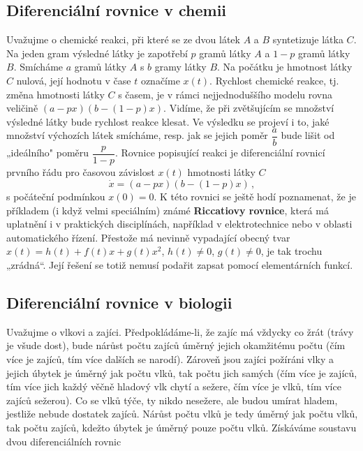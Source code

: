     \subsection{Diferenciální rovnice v chemii}
      Uvažujme o chemické reakci, při které se ze dvou látek \(A\) a \(B\) syntetizuje látka \(C\).
      Na jeden gram výsledné látky je zapotřebí \(p\) gramů látky \(A\) a \(1 - p\) gramů látky
      \(B\). Smícháme \(a\) gramů látky \(A\) s \(b\) gramy látky \(B\). Na počátku je hmotnost
      látky \(C\) nulová, její hodnotu v čase \(t\) označíme \(x(t)\). Rychlost chemické reakce, tj.
      změna hmotnosti látky \(C\) s časem, je v rámci nejjednoduššího modelu rovna veličině \((a -
      px) (b - (1 - p)x)\). Vidíme, že při zvětšujícím se množství výsledné látky bude rychlost
      reakce klesat. Ve výsledku se projeví i to, jaké množství výchozích látek smícháme, resp. jak
      se jejich poměr \(\dfrac{a}{b}\) bude lišit od „ideálního" poměru \(\dfrac{p}{1-p}\). Rovnice
      popisující reakci je diferenciální rovnicí prvního řádu pro časovou závislost \(x(t)\)
      hmotnosti látky \(C\)
      \begin{equation*}
        \boxed{\dot{x} = (a - px)(b - (1-p)x)}\, ,
      \end{equation*}
      s počáteční podmínkou \(x(0) = 0\). K této rovnici se ještě hodí poznamenat, že je příkladem
      (i když velmi speciálním) známé \textbf{Riccatiovy rovnice}, která má uplatnění i v
      praktických disciplínách, například v elektrotechnice nebo v oblasti automatického řízení.
      Přestože má nevinně vypadající obecný tvar \(x(t) = h(t) + f(t)x +g(t)x^2\), \(h(t) \neq 0\),
      \(g(t) \neq 0\), je tak trochu „zrádná“. Její řešení se totiž nemusí podařit zapsat pomocí
      elementárních funkcí. 
    
    \subsection{Diferenciální rovnice v biologii}
      Uvažujme o vlkovi a zajíci. Předpokládáme-li, že zajíc má vždycky co žrát (trávy je všude
      dost), bude nárůst počtu zajíců úměrný jejich okamžitému počtu (čím více je zajíců, tím více
      dalších se narodí). Zároveň jsou zajíci požíráni vlky a jejich úbytek je úměrný jak počtu
      vlků, tak počtu jich samých (čím více je zajíců, tím více jich každý věčně hladový vlk chytí a
      sežere, čím více je vlků, tím více zajíců sežerou). Co se vlků týče, ty nikdo nesežere, ale
      budou umírat hladem, jestliže nebude dostatek zajíců. Nárůst počtu vlků je tedy úměrný jak
      počtu vlků, tak počtu zajíců, kdežto úbytek je úměrný pouze počtu vlků. Získáváme soustavu
      dvou diferenciálních rovnic

